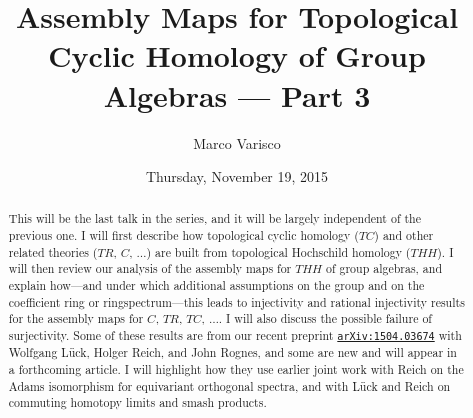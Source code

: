 \documentclass{UAmathtalk}
\author{Marco Varisco}
\title{Assembly Maps for Topological Cyclic Homology of Group Algebras --- Part 3}
\date{Thursday, November 19, 2015}
\begin{document}
\maketitle

\begin{abstract}
This will be the last talk in the series, and it will be largely independent of the previous one.
I will first describe how topological cyclic homology ($TC$) and other related theories ($TR$, $C$, $\ldots$) are built from topological Hochschild homology ($THH$).
I will then review our analysis of the assembly maps for $THH$ of group algebras, and explain how---and under which additional assumptions on the group and on the coefficient ring or ringspectrum---this leads to injectivity and rational injectivity results for the assembly maps for $C$, $TR$, $TC$, $\ldots.$
I will also discuss the possible failure of \mbox{surjectivity.}
Some of these results are from our recent preprint \href{https://arxiv.org/abs/1504.03674/}{\texttt{arXiv:1504.03674}} with Wolfgang Lück, Holger Reich, and John Rognes, and some are new and will appear in a forthcoming article.
I will highlight how they use earlier joint work with Reich on the Adams isomorphism for equivariant orthogonal spectra, and with Lück and Reich on commuting homotopy limits and smash products.
\end{abstract}
\end{document}
